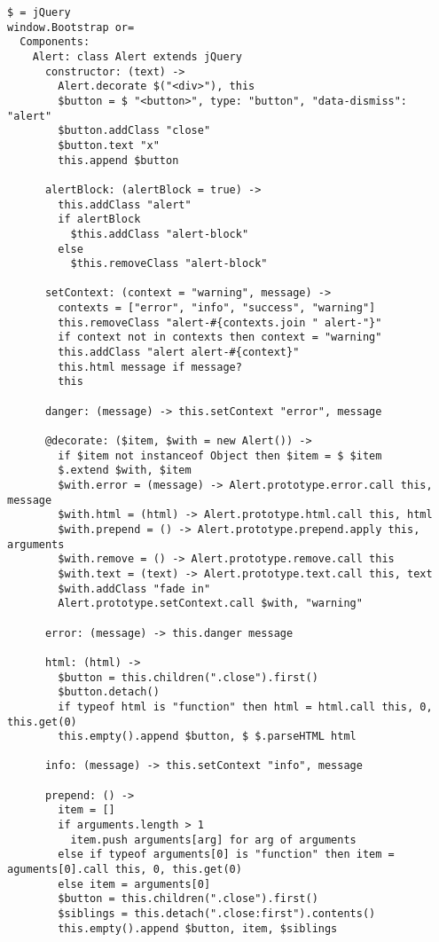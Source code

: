 \begin{lstlisting}
$ = jQuery
window.Bootstrap or=
  Components:
    Alert: class Alert extends jQuery
      constructor: (text) ->
        Alert.decorate $("<div>"), this
        $button = $ "<button>", type: "button", "data-dismiss": "alert"
        $button.addClass "close"
        $button.text "x"
        this.append $button
        
      alertBlock: (alertBlock = true) ->
        this.addClass "alert"
        if alertBlock
          $this.addClass "alert-block"
        else
          $this.removeClass "alert-block"
          
      setContext: (context = "warning", message) ->
        contexts = ["error", "info", "success", "warning"]
        this.removeClass "alert-#{contexts.join " alert-"}"
        if context not in contexts then context = "warning"
        this.addClass "alert alert-#{context}"
        this.html message if message?
        this
          
      danger: (message) -> this.setContext "error", message
        
      @decorate: ($item, $with = new Alert()) ->
        if $item not instanceof Object then $item = $ $item
        $.extend $with, $item
        $with.error = (message) -> Alert.prototype.error.call this, message
        $with.html = (html) -> Alert.prototype.html.call this, html
        $with.prepend = () -> Alert.prototype.prepend.apply this, arguments
        $with.remove = () -> Alert.prototype.remove.call this
        $with.text = (text) -> Alert.prototype.text.call this, text
        $with.addClass "fade in"
        Alert.prototype.setContext.call $with, "warning"
      
      error: (message) -> this.danger message
      
      html: (html) ->
        $button = this.children(".close").first()
        $button.detach()
        if typeof html is "function" then html = html.call this, 0, this.get(0)
        this.empty().append $button, $ $.parseHTML html
      
      info: (message) -> this.setContext "info", message
      
      prepend: () ->
        item = []
        if arguments.length > 1
          item.push arguments[arg] for arg of arguments
        else if typeof arguments[0] is "function" then item = aguments[0].call this, 0, this.get(0)
        else item = arguments[0]
        $button = this.children(".close").first()
        $siblings = this.detach(".close:first").contents()
        this.empty().append $button, item, $siblings
        

\end{lstlisting}
